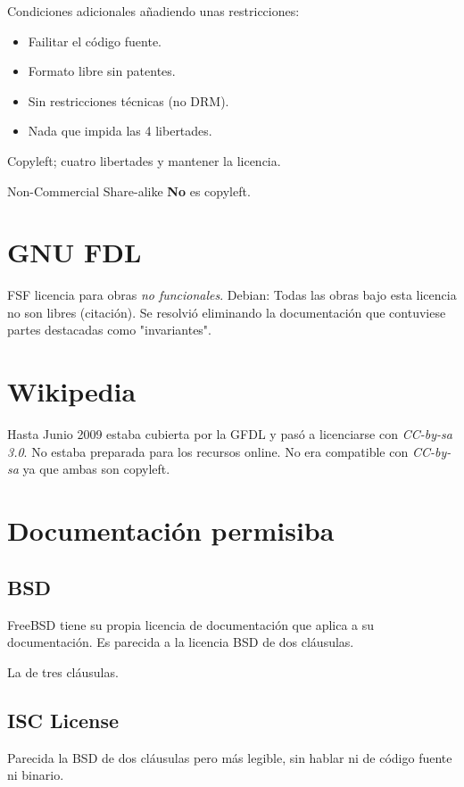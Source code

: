 \documentclass{scrartcl}
\begin{document}
Condiciones adicionales a\~nadiendo unas restricciones:
\begin{itemize}
    \item Failitar el c\'odigo fuente.
    \item Formato libre sin patentes.
    \item Sin restricciones t\'ecnicas (no DRM).
    \item Nada que impida las 4 libertades.
\end{itemize}

Copyleft; cuatro libertades y mantener la licencia.

Non-Commercial Share-alike \textbf{No} es copyleft.

\section{GNU FDL}

FSF licencia para obras \emph{no funcionales}. Debian: Todas las obras bajo esta licencia no son libres (citaci\'on). Se resolvi\'o eliminando la documentaci\'on que contuviese partes destacadas como "invariantes".

\section{Wikipedia}

Hasta Junio 2009 estaba cubierta por la GFDL y pas\'o a licenciarse con \emph{CC-by-sa 3.0}.
No estaba preparada para los recursos online.
No era compatible con \emph{CC-by-sa} ya que ambas son copyleft.

\section{Documentaci\'on permisiba}

\subsection{BSD}

FreeBSD tiene su propia licencia de documentaci\'on que aplica a su documentaci\'on. Es parecida a la licencia BSD de dos cl\'ausulas.

La de tres cl\'ausulas.

\subsection{ISC License}

Parecida la BSD de dos cl\'ausulas pero m\'as legible, sin hablar ni de c\'odigo fuente ni binario.
\end{document}
